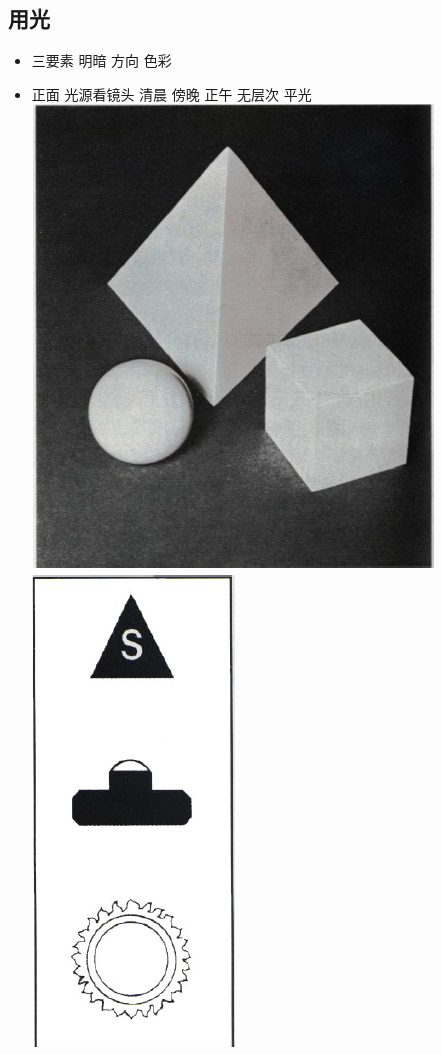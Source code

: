 \documentclass[
  letterpaper,
  DIV=11,
  numbers=noendperiod]{scrreprt}
\begin{document}
\subsection{用光}\label{ux7528ux5149}

\begin{itemize}
\item
  三要素 明暗 方向 色彩
\item
  正面 光源看镜头 清晨 傍晚 正午 无层次 平光
  \includegraphics{images/front.png}
  \includegraphics{images/posfront.png}

\end{itemize}
\end{document}

